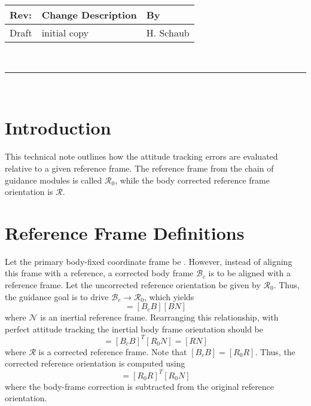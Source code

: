 \documentclass[]{AVSSimReportMemo}
\begin{document}
\makeCover


%
%
\pagestyle{empty}
{\renewcommand{\arraystretch}{1.1}
\noindent
\begin{longtable}{|p{0.5in}|p{4.5in}|p{1.14in}|}
\hline
{\bfseries Rev}: & {\bfseries Change Description} & {\bfseries By} \\
\hline
Draft & initial copy & H. Schaub \\
\hline

\end{longtable}
}

\newpage
\setcounter{page}{1}
\pagestyle{fancy}

\tableofcontents
~\\ \hrule ~\\


\section{Introduction}
This technical note outlines how the attitude tracking errors are evaluated relative to a given reference frame. The reference frame from the chain of guidance modules is called $\mathcal{R}_{0}$, while the body corrected reference frame orientation is $\mathcal{R}$.  

\section{Reference Frame Definitions}
Let the primary body-fixed coordinate frame be . However, instead of aligning this frame with a reference, a corrected body frame $\mathcal{B}_{c}$ is to be aligned with a reference frame.   Let the uncorrected reference orientation be given by $\mathcal{R}_{0}$.  Thus, the guidance goal is to drive $\mathcal{B}_{c} \rightarrow \mathcal{R}_{0}$, which yields
\begin{equation}
	[R_{0} N] = [B_{c} B] [BN]
\end{equation}
where $\mathcal{N}$ is an inertial reference frame.  Rearranging this relationship, with perfect attitude tracking the inertial body frame orientation should be
\begin{equation}
	 [BN] = [B_{c} B]^{T} [R_{0}N]  = [RN]
\end{equation}
where $\mathcal{R}$ is a corrected reference frame.  Note that $[B_{c} B] = [R_{0}R]$.  Thus, the corrected reference orientation is computed using
\begin{equation}
	 [RN] = [R_{0} R]^{T} [R_{0}N] 
\end{equation}
where the body-frame correction is subtracted from the original reference orientation.  
\end{document}
